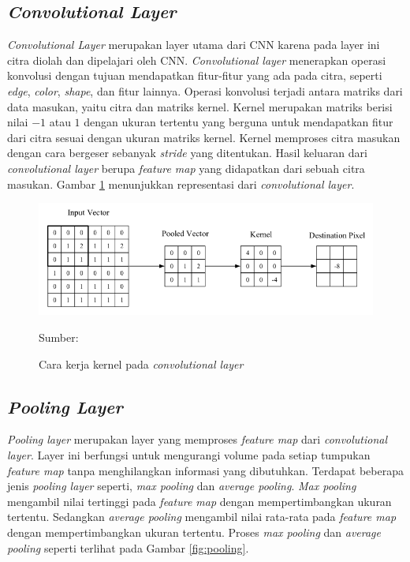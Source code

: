     \subsection{\textit{Convolutional Layer}}
    \textit{Convolutional Layer} merupakan layer utama dari CNN karena pada layer ini citra diolah dan dipelajari oleh CNN. \textit{Convolutional layer} menerapkan operasi konvolusi dengan tujuan mendapatkan fitur-fitur yang ada pada citra, seperti \textit{edge}, \textit{color}, \textit{shape}, dan fitur lainnya. Operasi konvolusi terjadi antara matriks dari data masukan, yaitu citra dan matriks kernel. Kernel merupakan matriks berisi nilai $-1$ atau $1$ dengan ukuran tertentu yang berguna untuk mendapatkan fitur dari citra sesuai dengan ukuran matriks kernel. Kernel memproses citra masukan dengan cara bergeser sebanyak \textit{stride} yang ditentukan. Hasil keluaran dari \textit{convolutional layer} berupa \textit{feature map} yang didapatkan dari sebuah citra masukan. Gambar \ref{fig:conv} menunjukkan representasi dari \textit{convolutional layer}.

    \begin{figure}[H]
        \begin{center}
            \includegraphics[width=12cm]{../img/CNN Convolutional Layer - Latex.png}
            \caption{Cara kerja kernel pada \textit{convolutional layer}}
            \label{fig:conv}
            Sumber: \citep{OShea2015}
        \end{center}
    \end{figure}

    \subsection{\textit{Pooling Layer}}
    \textit{Pooling layer} merupakan layer yang memproses \textit{feature map} dari \textit{convolutional layer}. Layer ini berfungsi untuk mengurangi volume pada setiap tumpukan \textit{feature map} tanpa menghilangkan informasi yang dibutuhkan. Terdapat beberapa jenis \textit{pooling layer} seperti, \textit{max pooling} dan \textit{average pooling}. \textit{Max pooling} mengambil nilai tertinggi pada \textit{feature map} dengan mempertimbangkan ukuran tertentu. Sedangkan \textit{average pooling} mengambil nilai rata-rata pada \textit{feature map} dengan mempertimbangkan ukuran tertentu. Proses \textit{max pooling} dan \textit{average pooling} seperti terlihat pada Gambar \ref{fig:pooling}.

